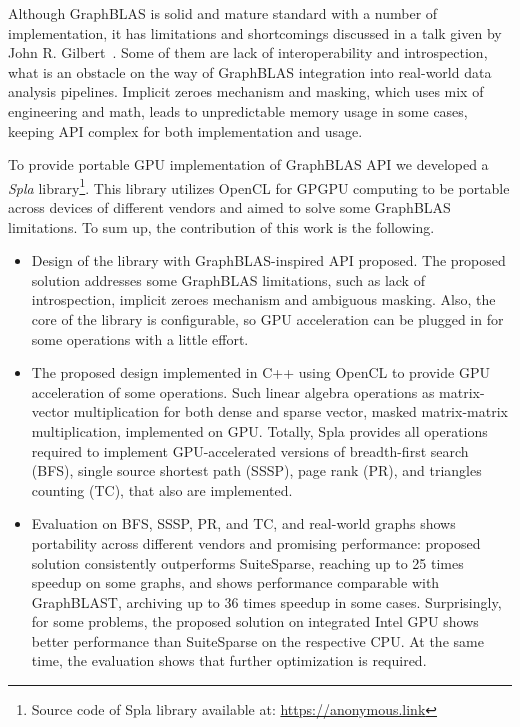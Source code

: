 Although GraphBLAS is solid and mature standard with a number of implementation, it has limitations and shortcomings discussed in a talk given by John R. Gilbert~\cite{talk:graphblas_did_wrong}. Some of them are lack of interoperability and introspection, what is an obstacle on the way of GraphBLAS integration into real-world data analysis pipelines. Implicit zeroes mechanism and masking, which uses mix of engineering and math, leads to unpredictable memory usage in some cases, keeping API complex for both implementation and usage.

To provide portable GPU implementation of GraphBLAS API we developed a \textit{Spla} library\footnote{Source code of Spla library available at: \url{https://anonymous.link}}.
This library utilizes OpenCL for GPGPU computing to be portable across devices of different vendors and aimed to solve some GraphBLAS limitations.
To sum up, the contribution of this work is the following.
\begin{itemize}
    \item Design of the library with GraphBLAS-inspired API proposed. The proposed solution addresses some GraphBLAS limitations, such as lack of introspection, implicit zeroes mechanism and ambiguous masking. Also, the core of the library is configurable, so GPU acceleration can be plugged in for some operations with a little effort.
    \item The proposed design implemented in C++ using OpenCL to provide GPU acceleration of some operations. Such linear algebra operations as matrix-vector multiplication for both dense and sparse vector, masked matrix-matrix multiplication, implemented on GPU. Totally, Spla provides all operations required to implement GPU-accelerated versions of breadth-first search (BFS), single source shortest path (SSSP), page rank (PR), and triangles counting (TC), that also are implemented.
    \item Evaluation on BFS, SSSP, PR, and TC, and real-world graphs shows portability across different vendors and promising performance: proposed solution consistently outperforms SuiteSparse, reaching up to 25 times speedup on some graphs, and shows performance comparable with GraphBLAST, archiving up to 36 times speedup in some cases. Surprisingly, for some problems, the proposed solution on integrated Intel GPU shows better performance than SuiteSparse on the respective CPU. At the same time, the evaluation shows that further optimization is required.
\end{itemize}